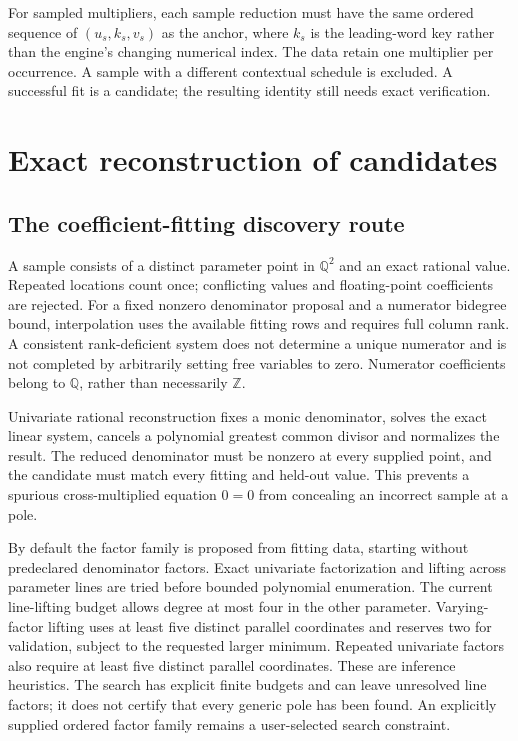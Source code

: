 \documentclass[11pt]{article}
\newcommand{\Q}{\mathbb Q}
\newcommand{\Z}{\mathbb Z}
\begin{document}
For sampled multipliers, each sample reduction must have the same ordered
sequence of $(u_s,k_s,v_s)$ as the anchor, where $k_s$ is the leading-word key
rather than the engine's changing numerical index. The data retain one
multiplier per occurrence. A sample with a different contextual schedule is
excluded. A successful fit is a candidate; the resulting identity still needs
exact verification.

\section{Exact reconstruction of candidates}
\subsection{The coefficient-fitting discovery route}
A sample consists of a distinct parameter point in $\Q^2$ and an exact rational
value. Repeated locations count once; conflicting values and floating-point
coefficients are rejected. For a fixed nonzero denominator proposal and a
numerator bidegree bound, interpolation uses the available fitting rows and
requires full column rank. A consistent rank-deficient system does not determine
a unique numerator and is not completed by arbitrarily setting free variables
to zero. Numerator coefficients belong to $\Q$, rather than necessarily $\Z$.

Univariate rational reconstruction fixes a monic denominator, solves the exact
linear system, cancels a polynomial greatest common divisor and normalizes the
result. The reduced denominator must be nonzero at every supplied point, and the
candidate must match every fitting and held-out value. This prevents a spurious
cross-multiplied equation $0=0$ from concealing an incorrect sample at a pole.

By default the factor family is proposed from fitting data, starting without
predeclared denominator factors. Exact univariate factorization and lifting
across parameter lines are tried before bounded polynomial enumeration.
The current line-lifting budget allows degree at most four in the other
parameter. Varying-factor lifting uses at least five distinct parallel coordinates
and reserves two for validation, subject to the requested larger minimum.
Repeated univariate factors also require at least five distinct parallel
coordinates. These are inference heuristics.
The search has explicit finite budgets and can leave unresolved line factors;
it does not certify that every generic pole has been found. An explicitly
supplied ordered factor family remains a user-selected search constraint.
\end{document}

